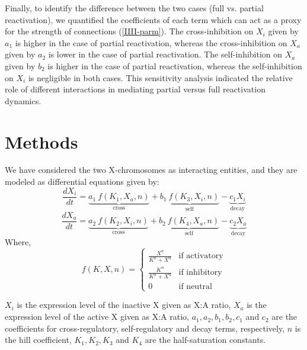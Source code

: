 \documentclass[11pt,a4paper]{article}
\begin{document}
Finally, to identify the difference between the two cases (full vs. partial reactivation), we quantified the coefficients of each term which can act as a proxy for the strength of connections (\autoref{IIII-parm}). The cross-inhibition on $X_i$ given by $a_1$ is higher in the case of partial reactivation, whereas the cross-inhibition on $X_a$ given by $a_2$ is lower in the case of partial reactivation. The self-inhibition on $X_a$ given by $b_2$ is higher in the case of partial reactivation, whereas the self-inhibition on $X_i$ is negligible in both cases. This sensitivity analysis indicated the relative role of different interactions in mediating partial versus full reactivation dynamics.

\section{Methods}

We have considered the two X-chromosomes as interacting entities, and they are modeled as differential equations given by:
\begin{equation}
    \frac{dX_i}{dt} = \underbrace{a_1\ f(K_1,X_a,n)}_\text{cross} + \underbrace{b_1\ f(K_3,X_i,n)}_\text{self} - \underbrace{c_1 X_i}_\text{decay}
\end{equation}
\begin{equation}
    \frac{dX_a}{dt} = \underbrace{a_2\ f(K_2,X_i,n)}_\text{cross} + \underbrace{b_2\ f(K_4,X_a,n)}_\text{self} - \underbrace{c_2 X_a}_\text{decay}
\end{equation}
Where, 
\begin{equation}
    f(K,X,n) = 
    \begin{cases} 
        \frac{{X}^n}{{K}^n+{X}^n} & \text{if activatory}\\
        \frac{{K}^n}{{K}^n+{X}^n} & \text{if inhibitory}\\
        0 & \text{if neutral}
    \end{cases}
\end{equation}

$X_i$ is the expression level of the inactive X given as X:A ratio, $X_a$ is the expression level of the active X given as X:A ratio, $a_1, a_2, b_1, b_2, c_1$ and $c_2$ are the coefficients for cross-regulatory, self-regulatory and decay terms, respectively, $n$ is the hill coefficient, $K_1,K_2,K_3$ and $K_4$ are the half-saturation constants.
\end{document}
